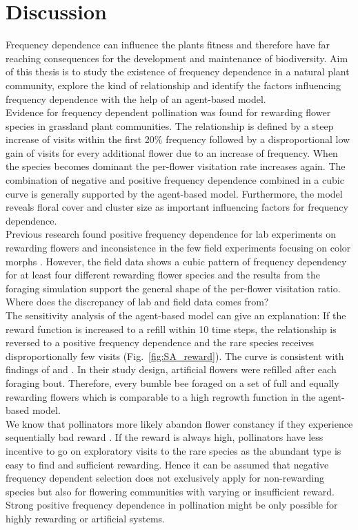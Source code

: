 \label{ch:discussion}
\section{Discussion}
Frequency dependence can influence the plants fitness and therefore have far reaching consequences for the development and maintenance of biodiversity. Aim of this thesis is to study the existence of frequency dependence in a natural plant community, explore the kind of relationship and identify the factors influencing frequency dependence with the help of an agent-based model.\\
Evidence for frequency dependent pollination was found for rewarding flower species in grassland plant communities. The relationship is defined by a steep increase of visits within the first 20\% frequency followed by a disproportional low gain of visits for every additional flower due to an increase of frequency. When the species becomes dominant the per-flower visitation rate increases again. The combination of negative and positive frequency dependence combined in a cubic curve is generally supported by the agent-based model. Furthermore, the model reveals floral cover and cluster size as important influencing factors for frequency dependence. \\


Previous research found positive frequency dependence for lab experiments on rewarding flowers and inconsistence in the few field experiments focusing on color morphs \citep{smithson2001pollinator}. However, the field data shows a cubic pattern of frequency dependency for at least four different rewarding flower species and the results from the foraging simulation support the general shape of the per-flower visitation ratio. Where does the discrepancy of lab and field data comes from?\\ 

The sensitivity analysis of the agent-based model can give an explanation: If the reward function is increased to a refill within 10 time steps, the relationship is reversed to a positive frequency dependence and the rare species receives disproportionally few visits (Fig.~\ref{fig:SA_reward}). The curve is consistent with findings of  \cite{smithson1997density} and \cite{smithson1996frequency}. In their study design, artificial flowers were refilled after each foraging bout. Therefore, every bumble bee foraged on a set of full and equally rewarding flowers which is comparable to a high regrowth function in the agent-based model.\\
We know that pollinators more likely abandon flower constancy if they experience sequentially bad reward \citep{chittka1997foraging,goulson1994model}. If the reward is always high, pollinators have less incentive to go on exploratory visits to the rare species as the abundant type is easy to find and sufficient rewarding. Hence it can be assumed that negative frequency dependent selection does not exclusively apply for non-rewarding species but also for flowering communities with varying or insufficient reward. Strong positive frequency dependence in pollination might be only possible for highly rewarding or artificial systems. 

